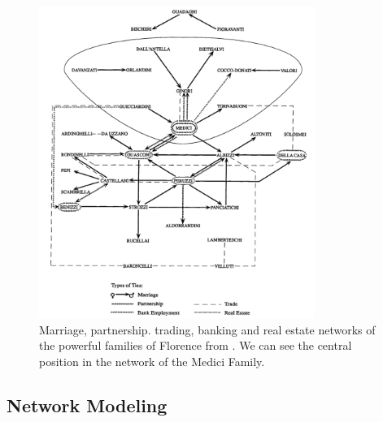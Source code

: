 \begin{figure}[!ht]
    \centering %
    \includegraphics[width=0.8\textwidth]{static/figures/RelatedWork/padgett-Medicis.png}
    \caption{Marriage, partnership. trading, banking and real estate networks of the powerful families of Florence from \cite{padgettRobustActionRise1993}. We can see the central position in the network of the Medici Family.}
    \label{fig:padgett-medicis}
\end{figure}



\subsection{Network Modeling}

